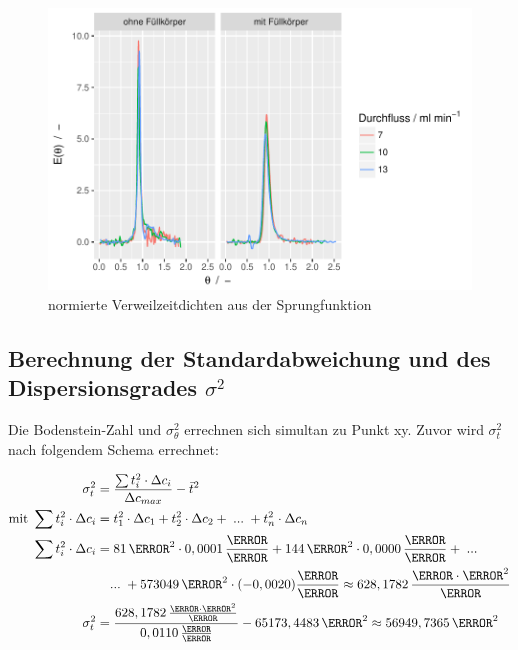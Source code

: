 \documentclass[12pt,liststotoc]{report}
\begin{document}
\begin{figure}[H]
\centering
\includegraphics[width=1\textwidth]{Graphics/E_theta_step.pdf}
\caption[normierte Verweilzeitdichte Sprungfunktion]{normierte Verweilzeitdichten aus der Sprungfunktion}
\label{dichte_step_norm}
\end{figure}
\noindent



\subsection{Berechnung der Standardabweichung und des Dispersionsgrades $\sigma^2$}

Die Bodenstein-Zahl und $\sigma_\theta^2$ errechnen sich simultan zu Punkt xy. Zuvor wird $\sigma_t^2$ nach folgendem Schema errechnet: 
 
\begin{align}
\sigma_t^2=&\;\frac{\sum t_i^2\cdot\Delta c_i}{\Delta c_{max}} - \bar{t}^2\\
\text{mit } \sum t_i^2\cdot\Delta c_i =&\;t_1^2\cdot \Delta c_1 + t_2^2\cdot \Delta c_2 +\;...\;+t_n^2\cdot \Delta c_n\\
 \sum t_i^2\cdot\Delta c_i =&\;81\,\s^2 \cdot 0,0001\,\frac{\mole}{\litre} + 144\,\s^2 \cdot 0,0000\,\frac{\mole}{\litre}+\;...\notag\\\notag
&...\;+ 573049\, \s^2 \cdot (-0,0020)\frac{\mole}{\litre}\approx 628,1782\,\frac{\mole\cdot\s^2}{\litre}\\\notag
 \sigma_t^2=&\;\frac{628,1782\,\frac{\mole\cdot \s^2}{\litre}}{0,0110\,\frac{\mole}{\litre}} - 65173,4483\,\s^2 \approx 56949,7365\,\s^2\\\notag
\end{align}
\end{document}
